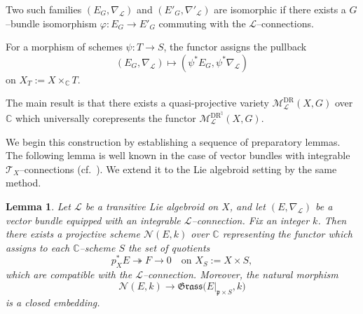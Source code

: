 \documentclass[12pt,reqno]{amsart}
\numberwithin{equation}{subsection}
\newtheorem{lem}[equation]{Lemma}
\theoremstyle{definition}
\theoremstyle{theorem}
\begin{document}
Two such families $(E_G,\nabla_{\mathcal L})$ and $(E'_G,\nabla'_{\mathcal L})$
are isomorphic if there exists a $G$--bundle isomorphism
$\varphi : E_G \to E'_G$ commuting with the $\mathcal L$--connections.

For a morphism of schemes $\psi : T \to S$, the functor assigns the pullback
\[
(E_G,\nabla_{\mathcal L}) \longmapsto
(\psi^*E_G,\psi^*\nabla_{\mathcal L})
\]
on $X_T := X \times_{\mathbb{C}} T$.




The main result is that there exists a quasi-projective variety $\mathcal{M}^{\text{DR}}_{\mathcal{L}}(X,G)$
over $\mathbb{C}$ which universally corepresents the functor
$\mathcal{M}^{\text{DR}^{\natural}}_{\mathcal{L}}(X,G)$. 

We begin this construction by establishing a sequence of preparatory lemmas. The following lemma is well known in the case of vector bundles with integrable $\mathcal{T}_X$--connections
(cf.~\cite[\S\,9, Lemma~9.9]{CT.Simpson-1995}).
We extend it to the Lie algebroid setting by the same method.

\begin{lem}\label{lem:projective-scheme-N(E,k)}
	Let $\mathcal{L}$ be a transitive Lie algebroid on $X$, and let $(E,\nabla_{\mathcal L})$
	be a vector bundle equipped with an integrable $\mathcal L$--connection.
	Fix an integer $k$.
	Then there exists a projective scheme $\mathcal{N}(E,k)$ over $\mathbb{C}$
	representing the functor which assigns to each $\mathbb{C}$--scheme $S$
	the set of quotients
	\[
	p_X^*E \twoheadrightarrow F \to 0
	\quad \text{on } X_S := X\times S,
	\]
	which are compatible with the $\mathcal L$--connection.
	Moreover, the natural morphism
	\[
	\mathcal{N}(E,k) \longrightarrow
	\mathfrak{Grass}\bigl(E|_{\mathfrak p\times S},k\bigr)
	\]
	is a closed embedding.
\end{lem}
\end{document}
